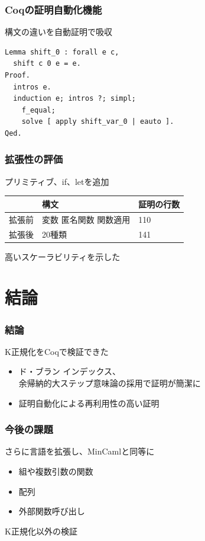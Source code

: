 \documentclass[dvipdfmx,cjk,xcolor=dvipsnames,envcountsect,notheorems,12pt]{beamer}
\theoremstyle{definition}
\begin{document}
\begin{frame}[fragile]
	\frametitle{Coqの証明自動化機能}
	\LARGE 構文の違いを自動証明で吸収

	\vfill

\begin{lstlisting}[frame=none]
Lemma shift_0 : forall e c,
  shift c 0 e = e.
Proof.
  intros e.
  induction e; intros ?; simpl;
    f_equal;
    solve [ apply shift_var_0 | eauto ].
Qed.
\end{lstlisting}
\end{frame}

\begin{frame}
	\frametitle{拡張性の評価}
	\LARGE プリミティブ、if、letを追加
	\begin{center}
		\large
		\begin{tabular}{l|ll}
			 & 構文 & 証明の行数 \\
			\hline
			拡張前 & 変数 匿名関数 関数適用 & 110 \\
			拡張後 & 20種類 & 141 \\
		\end{tabular}
	\end{center}

	\vfill

	高いスケーラビリティを示した
\end{frame}

\section{結論}

\begin{frame}
	\frametitle{結論}
	\Large K正規化をCoqで検証できた
	\begin{itemize}
		\item ド・ブラン インデックス、\\余帰納的大ステップ意味論の採用で証明が簡潔に
		\item 証明自動化による再利用性の高い証明
	\end{itemize}
\end{frame}

\begin{frame}
	\frametitle{今後の課題}
	\Large さらに言語を拡張し、MinCamlと同等に
	\begin{itemize}
		\item 組や複数引数の関数
		\item 配列
		\item 外部関数呼び出し
	\end{itemize}

	\vfill

	K正規化以外の検証
\end{frame}
\end{document}
